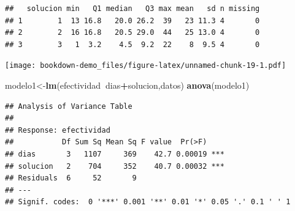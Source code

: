 \documentclass[]{book}
\newenvironment{Shaded}{\begin{snugshade}}{\end{snugshade}}
\newcommand{\KeywordTok}[1]{\textcolor[rgb]{0.13,0.29,0.53}{\textbf{#1}}}
\newcommand{\DataTypeTok}[1]{\textcolor[rgb]{0.13,0.29,0.53}{#1}}
\newcommand{\StringTok}[1]{\textcolor[rgb]{0.31,0.60,0.02}{#1}}
\newcommand{\OperatorTok}[1]{\textcolor[rgb]{0.81,0.36,0.00}{\textbf{#1}}}
\newcommand{\NormalTok}[1]{#1}
\begin{document}
\begin{Shaded}
\end{Shaded}

\begin{verbatim}
##   solucion min   Q1 median   Q3 max mean   sd n missing
## 1        1  13 16.8   20.0 26.2  39   23 11.3 4       0
## 2        2  16 16.8   20.5 29.0  44   25 13.0 4       0
## 3        3   1  3.2    4.5  9.2  22    8  9.5 4       0
\end{verbatim}

\begin{Shaded}
\end{Shaded}

\texttt{[image: bookdown-demo\_files/figure-latex/unnamed-chunk-19-1.pdf]}

\begin{Shaded}
\begin{Highlighting}[]
\NormalTok{modelo1<-}\KeywordTok{lm}\NormalTok{(efectividad}\OperatorTok{~}\NormalTok{dias}\OperatorTok{+}\NormalTok{solucion,datos)}
\KeywordTok{anova}\NormalTok{(modelo1)}
\end{Highlighting}
\end{Shaded}

\begin{verbatim}
## Analysis of Variance Table
## 
## Response: efectividad
##           Df Sum Sq Mean Sq F value  Pr(>F)    
## dias       3   1107     369    42.7 0.00019 ***
## solucion   2    704     352    40.7 0.00032 ***
## Residuals  6     52       9                    
## ---
## Signif. codes:  0 '***' 0.001 '**' 0.01 '*' 0.05 '.' 0.1 ' ' 1
\end{verbatim}
\end{document}
